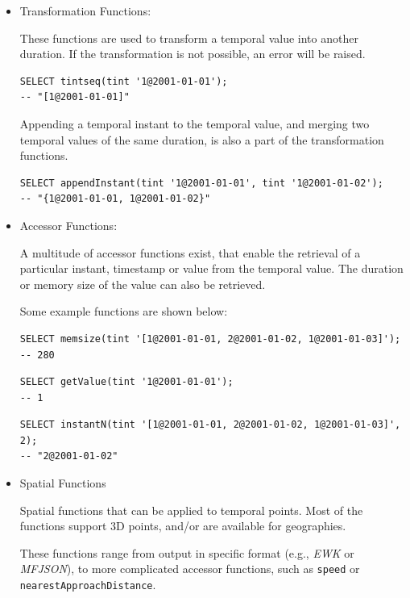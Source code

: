 \begin{itemize}
    \item Transformation Functions:

        These functions are used to transform a temporal value into another duration. If the transformation is not possible, an error will be raised. 

        \begin{lstlisting}
SELECT tintseq(tint '1@2001-01-01');
-- "[1@2001-01-01]"
        \end{lstlisting}

        Appending a temporal instant to the temporal value, and merging two temporal values of the same duration, is also a part of the transformation functions.

        \begin{lstlisting}
SELECT appendInstant(tint '1@2001-01-01', tint '1@2001-01-02');
-- "{1@2001-01-01, 1@2001-01-02}"
        \end{lstlisting}

    \item Accessor Functions:

        A multitude of accessor functions exist, that enable the retrieval of a particular instant, timestamp or value from the temporal value. The duration or memory size of the value can also be retrieved.

        Some example functions are shown below:

        \begin{lstlisting}
SELECT memsize(tint '[1@2001-01-01, 2@2001-01-02, 1@2001-01-03]');
-- 280
        \end{lstlisting}

        \begin{lstlisting}
SELECT getValue(tint '1@2001-01-01');
-- 1
        \end{lstlisting}

        \begin{lstlisting}
SELECT instantN(tint '[1@2001-01-01, 2@2001-01-02, 1@2001-01-03]', 2);
-- "2@2001-01-02"
        \end{lstlisting}

    \item Spatial Functions

        Spatial functions that can be applied to temporal points. Most of the functions support 3D points, and/or are available for geographies.

        These functions range from output in specific format (e.g., \textit{EWK} or \textit{MFJSON}), to more complicated accessor functions, such as \lstinline{speed} or \lstinline{nearestApproachDistance}.


\end{itemize}
